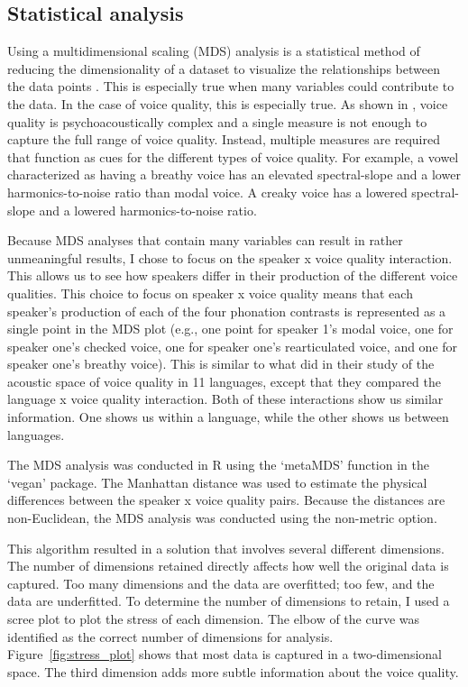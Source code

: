 \subsection{Statistical analysis} \label{sec:acousticlandscape:statistics}

Using a multidimensional scaling (MDS) analysis is a statistical method of reducing the dimensionality of a dataset to visualize the relationships between the data points \citep{kruskalMultidimensionalScaling1978}. This is especially true when many variables could contribute to the data. In the case of voice quality, this is especially true. As shown in \citet{kreimanUnifiedTheoryVoice2014,kreimanValidatingPsychoacousticModel2021,garellekAcousticDiscriminabilityComplex2020}, voice quality is psychoacoustically complex and a single measure is not enough to capture the full range of voice quality. Instead, multiple measures are required that function as cues for the different types of voice quality. For example, a vowel characterized as having a breathy voice has an elevated spectral-slope and a lower harmonics-to-noise ratio than modal voice. A creaky voice has a lowered spectral-slope and a lowered harmonics-to-noise ratio. 

Because MDS analyses that contain many variables can result in rather unmeaningful results, I chose to focus on the speaker x voice quality interaction. This allows us to see how speakers differ in their production of the different voice qualities. This choice to focus on speaker x voice quality means that each speaker's production of each of the four phonation contrasts is represented as a single point in the MDS plot (e.g., one point for speaker 1's modal voice, one for speaker one's checked voice, one for speaker one's rearticulated voice, and one for speaker one's breathy voice). This is similar to what \citet{keatingCrosslanguageAcousticSpace2023} did in their study of the acoustic space of voice quality in 11 languages, except that they compared the language x voice quality interaction. Both of these interactions show us similar information. One shows us within a language, while the other shows us between languages.

The MDS analysis was conducted in R using the  `metaMDS' function in the `vegan' package. The Manhattan distance was used to estimate the physical differences between the speaker x voice quality pairs. Because the distances are non-Euclidean, the MDS analysis was conducted using the non-metric option. 

This algorithm resulted in a solution that involves several different dimensions. The number of dimensions retained directly affects how well the original data is captured. Too many dimensions and the data are overfitted; too few, and the data are underfitted. To determine the number of dimensions to retain, I used a scree plot to plot the stress of each dimension. The elbow of the curve was identified as the correct number of dimensions for analysis. Figure~\ref{fig:stress_plot} shows that most data is captured in a two-dimensional space. The third dimension adds more subtle information about the voice quality.

